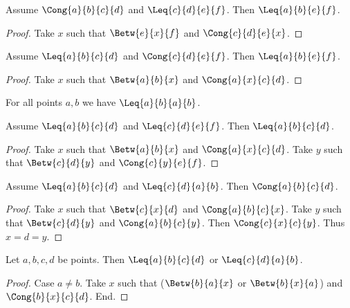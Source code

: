 \documentclass[10pt,a4paper,parskip=half,numbers=endperiod,parskip]{scrartcl}
\begin{document}
  \begin{forthel}
    \begin{lemma} %
      Assume $\Cong{a}{b}{c}{d}$ and $\Leq{c}{d}{e}{f}$.
      Then $\Leq{a}{b}{e}{f}$.
    \end{lemma}
    \begin{proof}
      Take $x$ such that $\Betw{e}{x}{f}$ and $\Cong{c}{d}{e}{x}$.
    \end{proof}

    \begin{lemma} %
      Assume $\Leq{a}{b}{c}{d}$ and $\Cong{c}{d}{e}{f}$.
      Then $\Leq{a}{b}{e}{f}$.
    \end{lemma}
    \begin{proof}
      Take $x$ such that $\Betw{a}{b}{x}$ and $\Cong{a}{x}{c}{d}$.
    \end{proof}

    \begin{lemma} %
      For all points $a, b$ we have $\Leq{a}{b}{a}{b}$.
    \end{lemma}

    \begin{lemma} %
      Assume $\Leq{a}{b}{c}{d}$ and $\Leq{c}{d}{e}{f}$.
      Then $\Leq{a}{b}{c}{d}$.
    \end{lemma}
    \begin{proof}
      Take $x$ such that $\Betw{a}{b}{x}$ and $\Cong{a}{x}{c}{d}$.
      Take $y$ such that $\Betw{c}{d}{y}$ and $\Cong{c}{y}{e}{f}$.
    \end{proof}

    \begin{lemma} %
      Assume $\Leq{a}{b}{c}{d}$ and $\Leq{c}{d}{a}{b}$.
      Then $\Cong{a}{b}{c}{d}$.
    \end{lemma}
    \begin{proof}
      Take $x$ such that $\Betw{c}{x}{d}$ and $\Cong{a}{b}{c}{x}$.
      Take $y$ such that $\Betw{c}{d}{y}$ and $\Cong{a}{b}{c}{y}$.
      Then $\Cong{c}{x}{c}{y}$.
      Thus $x = d = y$.
    \end{proof}

    \begin{lemma} %
      Let $a, b, c, d$ be points.
      Then $\Leq{a}{b}{c}{d}$ or $\Leq{c}{d}{a}{b}$.
    \end{lemma}
    \begin{proof}
      Case $a \neq b$.
        Take $x$ such that
        ($\Betw{b}{a}{x}$ or $\Betw{b}{x}{a}$) and $\Cong{b}{x}{c}{d}$.
      End.
    \end{proof}


\end{forthel}
\end{document}
